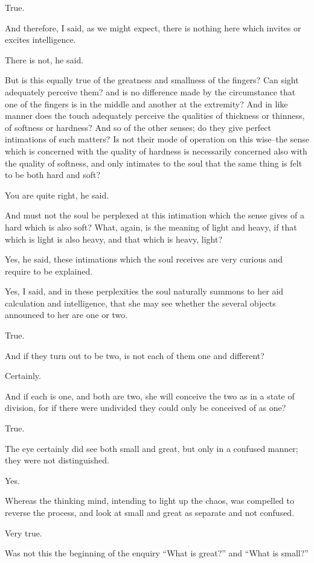 True.

And therefore, I said, as we might expect, there is nothing here which
invites or excites intelligence.

There is not, he said.

But is this equally true of the greatness and smallness of the fingers?
Can sight adequately perceive them? and is no difference made by the
circumstance that one of the fingers is in the middle and another at
the extremity? And in like manner does the touch adequately perceive the
qualities of thickness or thinness, of softness or hardness? And so of
the other senses; do they give perfect intimations of such matters? Is
not their mode of operation on this wise--the sense which is concerned
with the quality of hardness is necessarily concerned also with the
quality of softness, and only intimates to the soul that the same thing
is felt to be both hard and soft?

You are quite right, he said.

And must not the soul be perplexed at this intimation which the sense
gives of a hard which is also soft? What, again, is the meaning of
light and heavy, if that which is light is also heavy, and that which is
heavy, light?

Yes, he said, these intimations which the soul receives are very curious
and require to be explained.

Yes, I said, and in these perplexities the soul naturally summons to her
aid calculation and intelligence, that she may see whether the several
objects announced to her are one or two.

True.

And if they turn out to be two, is not each of them one and different?

Certainly.

And if each is one, and both are two, she will conceive the two as in
a state of division, for if there were undivided they could only be
conceived of as one?

True.

The eye certainly did see both small and great, but only in a confused
manner; they were not distinguished.

Yes.

Whereas the thinking mind, intending to light up the chaos, was
compelled to reverse the process, and look at small and great as
separate and not confused.

Very true.

Was not this the beginning of the enquiry ``What is great?'' and ``What is
small?''

